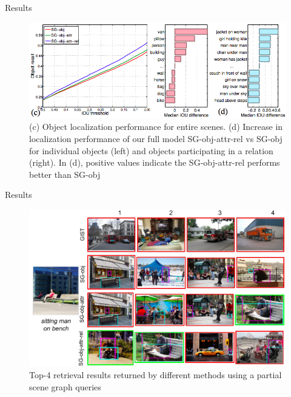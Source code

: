 \documentclass{IFES-beamer}
\begin{document}
    \begin{frame}{Results}
        \begin{figure}
            \centering
            \includegraphics[scale=0.4]{Images/grapf_c_d.png}
            \caption{\cite{Johnson_2015_CVPR}(c) Object localization performance for entire scenes. (d) Increase in localization performance of our full model SG-obj-attr-rel vs SG-obj for individual objects (left) and objects participating in a relation (right). In (d), positive values indicate the SG-obj-attr-rel performs better than SG-obj}
            \label{fig:my_label}
        \end{figure}
    \end{frame}
    
    \begin{frame}{Results}
        \begin{figure}
            \centering
            \includegraphics[scale=0.45]{Images/result3.png}
            \caption{\cite{Johnson_2015_CVPR}Top-4 retrieval results returned by different methods using a partial scene graph queries}
            \label{fig:my_label}
        \end{figure}
    \end{frame}
    
\end{document}
